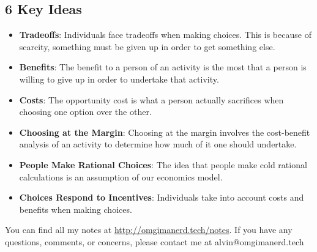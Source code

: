 \documentclass{article}
\begin{document}
\subsection*{6 Key Ideas}
\begin{itemize}
  \item \textbf{Tradeoffs}: Individuals face tradeoffs when making choices.
  This is because of scarcity, something must be given up in order to get
  something else.
  \item \textbf{Benefits}: The benefit to a person of an activity is the most
  that a person is willing to give up in order to undertake that activity.
  \item \textbf{Costs}: The opportunity cost is what a person actually
  sacrifices when choosing one option over the other.
  \item \textbf{Choosing at the Margin}: Choosing at the margin involves
  the cost-benefit analysis of an activity to determine how much of it one
  should undertake.
  \item \textbf{People Make Rational Choices}: The idea that people make cold
  rational calculations is an assumption of our economics model.
  \item \textbf{Choices Respond to Incentives}: Individuals take into account
  costs and benefits when making choices.
\end{itemize}

\begin{center}
  You can find all my notes at \url{http://omgimanerd.tech/notes}. If you have
  any questions, comments, or concerns, please contact me at
  alvin@omgimanerd.tech
\end{center}
\end{document}
